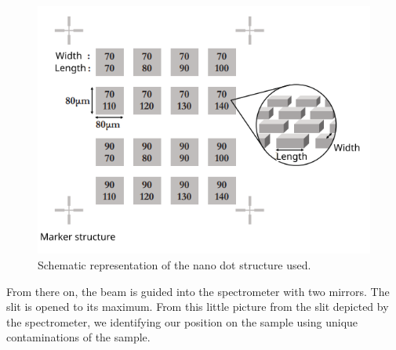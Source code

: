 \begin{figure}[ht]
    \centering
    \includegraphics[width = 0.8\linewidth]{Bilder/Setup/SchemeDots.png}
    \caption{Schematic representation of the nano dot structure used.}
    \label{fig:NanoDotSketch}
\end{figure}

From there on, the beam is guided into the spectrometer with two mirrors. The slit is opened to its maximum. From this little 
picture from the slit depicted by the spectrometer, we identifying our position on the sample using unique contaminations of the sample. 
